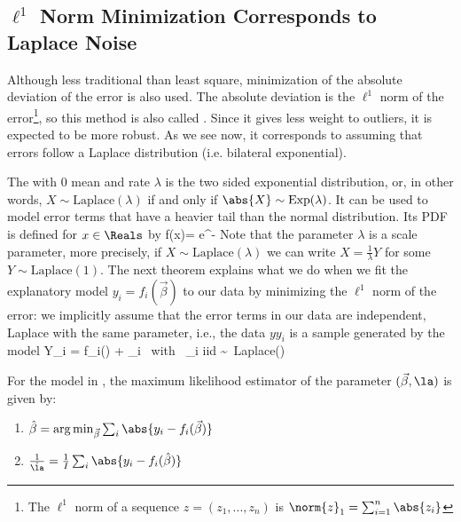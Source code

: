 

\subsection{$\ell^1$ Norm
Minimization Corresponds to Laplace Noise}

Although less traditional than least square,
minimization of the absolute deviation of the
error is also used. The absolute deviation is the
$\ell^1$ norm of the error\footnote{The $\ell^1$
norm of a sequence $z=(z_1,...,z_n)$ is
$\norm{z}_1=\sum_{i=1}^n \abs{z_i}$}, so this
method is also called . Since it gives less weight to
outliers, it is expected to be more robust. As we
see now, it corresponds to assuming that errors
follow a Laplace distribution (i.e. bilateral
exponential).

The \label{def-laplace}
with $0$ mean and rate $\lambda$ is the two sided
exponential distribution, or, in other words, $X
\sim \mbox{
 Laplace}(\lambda)$ if and only if $\abs{X}\sim \mbox{Exp}(\lambda)$.
It can be used to model error terms that have a heavier tail
 than the normal distribution. Its PDF is defined for $x \in
 \Reals$ by
 \be
 f(x)= e^{-\lambda{}}
 \ee
%
Note that the parameter $\lambda$ is a scale parameter, more precisely, if $X
\sim \mbox{
 Laplace}(\lambda)$ we can write $X=\frac1{\lambda} Y$ for some $Y
\sim \mbox{
 Laplace}(1)$. The next theorem explains what we do when we fit
the explanatory model $y_i= f_i(\vec{\beta})$ to
our data by minimizing the $\ell^1$ norm of the
error: we implicitly assume that the error terms
in our data are independent, Laplace with the
same parameter, i.e., the data $yy_i$ is a sample
generated by the model
\be
 Y_i = f_i(\vec{\beta}) + \eps_i \mbox{ with } \eps_i \mbox{iid} \sim \mbox{
 Laplace}(\lambda) \label{eq:ld-mod}
 \ee
\begin{shadethm} For the model in ,
the maximum likelihood estimator of the parameter
$(\vec{\beta},\la)$ is given by:\begin{enumerate}
    \item
$\hat{\beta}  = \arg\min_{\vec{\beta}} \sum_{i} \abs{y_i -
f_i(\vec{\beta})}$
    \item
$\frac{1}{\hat{\la}}=\frac{1}{I}\sum_i\abs{y_i
-f_i(\hat{\beta})}$
\end{enumerate}
%
 \label{theo-ladlls}
\end{shadethm}

